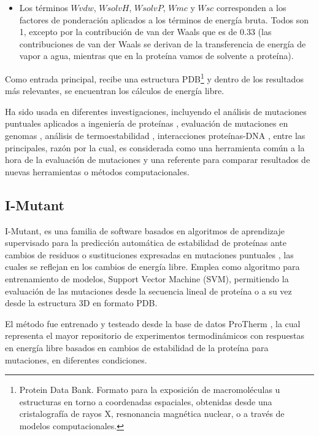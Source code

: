\begin{itemize}
	\item Los términos $Wvdw$, $WsolvH$, $WsolvP$, $Wmc$ y $Wsc$ corresponden a los factores de ponderación aplicados a los términos de energía bruta. Todos son 1, excepto por la contribución de van der Waals que es de 0.33 (las contribuciones de van der Waals se derivan de la transferencia de energía de vapor a agua, mientras que en la proteína vamos de solvente a proteína).
	
\end{itemize}

Como entrada principal, recibe una estructura PDB\footnote{Protein Data Bank. Formato para la exposición de macromoléculas u estructuras en torno a coordenadas espaciales, obtenidas desde una cristalografía de rayos X, resnonancia magnética nuclear, o a través de modelos computacionales.} y dentro de los resultados más relevantes, se encuentran los cálculos de energía libre.

Ha sido usada en diferentes investigaciones, incluyendo el análisis de mutaciones puntuales aplicados a ingeniería de proteínas \cite{BU201825, Alibes2010}, evaluación de mutaciones en genomas \cite{Sanchez2008}, análisis de termoestabilidad \cite{Bu2018, 10.1093/protein/gzv004}, interacciones proteínas-DNA \cite{NADRA20113}, entre las principales, razón por la cual, es considerada como una herramienta común a la hora de la evaluación de mutaciones y una referente para comparar resultados de nuevas herramientas o métodos computacionales.

\subsection{I-Mutant}

I-Mutant, es una familia de software basados en algoritmos de aprendizaje supervisado para la predicción automática de estabilidad de proteínas ante cambios de residuos o sustituciones expresadas en mutaciones puntuales \cite{capriotti2005mutant2}, las cuales se reflejan en los cambios de energía libre. Emplea como algoritmo para entrenamiento de modelos, Support Vector Machine (SVM), permitiendo la evaluación de las mutaciones desde la secuencia lineal de proteína o a su vez desde la estructura 3D en formato PDB.

El método fue entrenado y testeado desde la base de datos ProTherm \cite{Bava2004}, la cual representa el mayor repositorio de experimentos termodinámicos con respuestas en energía libre basados en cambios de estabilidad de la proteína para mutaciones, en diferentes condiciones. 

